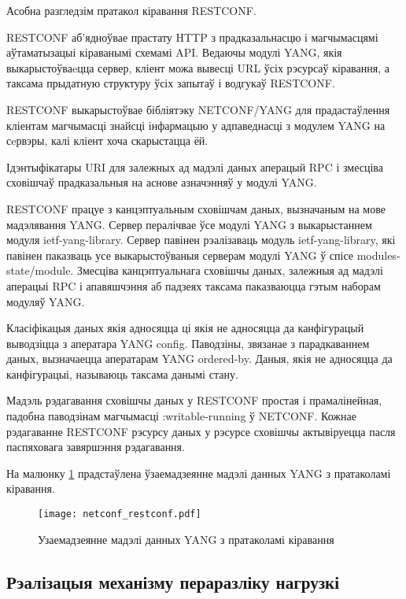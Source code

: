 Асобна разгледзім пратакол кіравання RESTCONF.

RESTCONF аб'ядноўвае прастату HTTP з прадказальнасцю і магчымасцямі аўтаматызацыі кіраванымі схемамі API. Ведаючы модулі YANG, якія выкарыстоўваeцца сервер, кліент можа вывесці URL ўсіх рэсурсаў кіравання, а таксама прыдатную структуру ўсіх запытаў і водгукаў RESTCONF.

RESTCONF выкарыстоўвае бібліятэку NETCONF/YANG для прадастаўлення кліентам магчымасці знайсці інфармацыю у адпаведнасці з модулем YANG на сeрвэры, калі кліент хоча скарыстацца ёй.

Ідэнтыфікатары URI для залежных ад мадэлі даных аперацый RPC і змесціва сховішчаў прадказальныя на аснове азначэнняў у модулі YANG.

RESTCONF працуе з канцэптуальным сховішчам даных, вызначаным на мове мадэлявання YANG. Сервер пералічвае ўсе модулі YANG з выкарыстаннем модуля ietf-yang-library. Сервер павінен рэалізаваць модуль ietf-yang-library, які павінен паказваць усе выкарыстоўваныя серверам модулі YANG ў спісе modules-state/module. Змесціва канцэптуальнага сховішчы даных, залежныя ад мадэлі аперацыі RPC і апавяшчэння аб падзеях таксама паказваюцца гэтым наборам модуляў YANG.

Класіфікацыя даных якія адносяцца ці якія не адносяцца да канфігурацый выводзіцца з аператара YANG config. Паводзіны, звязанае з парадкаваннем даных, вызначаецца аператарам YANG ordered-by. Даныя, якія не адносяцца да канфігурацыі, называюць таксама данымі стану.

Мадэль рэдагавання сховішчы даных у RESTCONF простая і прамалінейная, падобна паводзінам магчымасці :writable-running ў NETCONF. Кожнае рэдагаванне RESTCONF рэсурсу даных у рэсурсе сховішчы актывіруецца пасля паспяховага завяршэння рэдагавання.

На малюнку \ref{img: netconf-restconf} прадстаўлена ўзаемадзеянне мадэлі данных YANG з пратаколамі кіравання.

\begin{figure}[ht!]
    \centering
    \texttt{[image: netconf\_restconf.pdf]}
    \caption{Узаемадзеянне мадэлі данных YANG з пратаколамі кіравання}
    \label{img: netconf-restconf}
\end{figure}

\subsection{Рэалізацыя механізму пераразліку нагрузкі}

